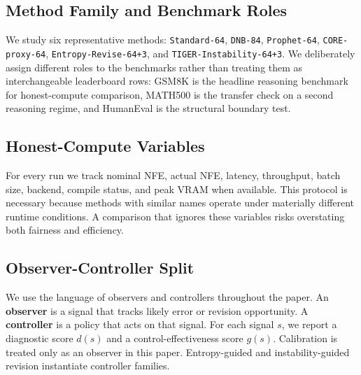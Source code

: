 \documentclass{article}
\begin{document}
\subsection{Method Family and Benchmark Roles}

We study six representative methods: \texttt{Standard-64}, \texttt{DNB-84}, \texttt{Prophet-64}, \texttt{CORE-proxy-64}, \texttt{Entropy-Revise-64+3}, and \texttt{TIGER-Instability-64+3}. We deliberately assign different roles to the benchmarks rather than treating them as interchangeable leaderboard rows: GSM8K is the headline reasoning benchmark for honest-compute comparison, MATH500 is the transfer check on a second reasoning regime, and HumanEval is the structural boundary test.

\subsection{Honest-Compute Variables}

For every run we track nominal NFE, actual NFE, latency, throughput, batch size, backend, compile status, and peak VRAM when available. This protocol is necessary because methods with similar names operate under materially different runtime conditions. A comparison that ignores these variables risks overstating both fairness and efficiency.

\subsection{Observer-Controller Split}

We use the language of observers and controllers throughout the paper. An \textbf{observer} is a signal that tracks likely error or revision opportunity. A \textbf{controller} is a policy that acts on that signal. For each signal $s$, we report a diagnostic score $d(s)$ and a control-effectiveness score $g(s)$. Calibration is treated only as an observer in this paper. Entropy-guided and instability-guided revision instantiate controller families.
\end{document}
